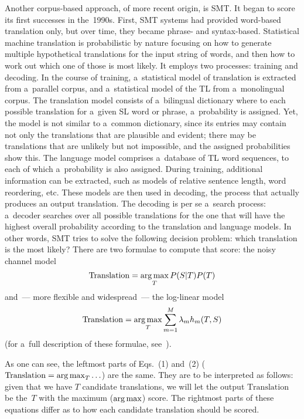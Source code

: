 \begin{multicols}{2}
  Another corpus-based approach, of more recent origin, is 
SMT. It began to score its first successes in the~1990s. First, SMT 
systems had provided word-based translation only, but over time, they became 
phrase- and syntax-based. Statistical machine translation 
is probabilistic by nature focusing on how to 
generate multiple hypothetical translations for the input string of words, and then 
how to work out which one of those is most likely. It employs two processes: 
training and decoding. In the course of training, a~statistical model of translation is 
extracted from a~parallel corpus, and a~statistical model of the TL from a~monolingual corpus. The translation model consists of a~bilingual dictionary 
where to each possible translation for a~given SL word or phrase, a~probability is 
assigned. Yet, the model is not similar to a~common dictionary, since its entries 
may contain not only the translations that are plausible and evident; there may be 
translations that are unlikely but not impossible, and the assigned probabilities 
show this. The language model comprises a~database of TL word sequences, to 
each of which a~probability is also assigned. During training, additional 
information can be extracted, such as models of relative sentence length, word 
reordering, etc. These models are then used in decoding, the process that actually 
produces an output translation. The decoding is per se a~search process: a~decoder 
searches over all possible translations for the one that will have the highest overall 
probability according to the translation and language models. In other words, SMT 
tries to solve the following decision problem: which translation is the most likely? 
There are two formulae to compute that score: the noisy channel model
\begin{equation}
  \mathrm{Translation} = \mathop{\mathrm{arg}\,\mathrm{max}}\limits_T P(S\vert T)  P(T)
  \label{e1-n}
  \end{equation}
and~--- more flexible and widespread~--- the log-linear model
\begin{equation}
  \mathrm{Translation} = \mathop{\mathrm{arg}\,\mathrm{max}}\limits_T \sum\limits_{m=1}^M \lambda_m h_m(T,S)
  \label{e2-n}
  \end{equation}
(for a~full 
description of these formulae, see~\cite{12-n}).
   
 
  
  
  As one can see, the leftmost parts of Eqs.~(1) and~(2) ($\mathrm{Translation} \hm= 
\argmax_T\ldots$) are the same. They are to be interpreted as follows: given that 
we have $T$ candidate translations, we will let the output $\mathrm{Translation}$ be 
the~$T$ with the maximum ($\mathop{\mathrm{arg}\,\mathrm{max}}$) score. The rightmost parts of these 
equations differ as to how each candidate translation should be scored.
  

\end{multicols}
